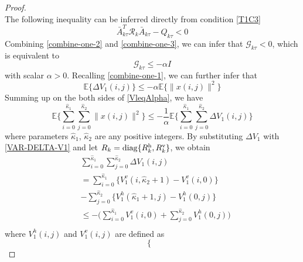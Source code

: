 \documentclass[journal,final,twocolumn]{IEEEtran}
\begin{document}
\begin{proof}
\begin{equation}
	\end{equation}
	The following inequality can be  inferred directly from condition \eqref{T1C3} 
	\begin{equation}\label{combine-one-3}
		\bar{A}^{T}_{k\tau }\mathcal{R}_{k}\bar{A}_{k\tau }-Q_{k\tau } < 0
	\end{equation}
	Combining \eqref{combine-one-2} and \eqref{combine-one-3}, we can infer that $\mathcal{G}_{k\tau }<0$, which is equivalent to 
	\begin{equation}
		\mathcal{G}_{k\tau } \leq -\alpha I
	\end{equation}
	with scalar $\alpha>0$.
	Recalling \eqref{combine-one-1}, we can further infer that
	\begin{equation}\label{VleqAlpha}
		\mathbb{E}\{\varDelta V_{1}(i,j) \} \leq-\alpha \mathbb{E}\{\|x(i,j)\|^{2} \}
	\end{equation}
	Summing up on the both sides of \eqref{VleqAlpha}, we have
	\begin{equation} \label{levE}
		\mathbb{E}\Big\{\sum_{i=0}^{\hat{\kappa}_{1}}\sum_{j=0}^{\hat{\kappa}_{2}}  \|x(i,j)\|^{2} \Big\} \leq -\frac{1}{\alpha} \mathbb{E}\Big\{\sum_{i=0}^{\hat{\kappa}_{1}}\sum_{j=0}^{\hat{\kappa}_{2}}  \varDelta V_{1}(i,j)  \Big\}
	\end{equation}
	where parameters $\hat{\kappa}_{1}$, $\hat{\kappa}_{2}$ are any positive integers. By substituting $\varDelta V_{1}$ with \eqref{VAR-DELTA-V1} and let $R_{k}=\mathrm{diag}\{R^{\rm{h}}_{k},R^{\rm{v}}_{k}\}$, we obtain
	\begin{equation} \label{Vhv}
		\begin{split}
			&\sum_{i=0}^{\hat{\kappa}_{1}}\sum_{j=0}^{\hat{\kappa}_{2}}  \varDelta V_{1}(i,j)\\&= \sum_{i=0}^{\hat{\kappa}_{1}}\big\{V^{v}_{1}(i,\hat{\kappa}_{2}+1) - V^{v}_{1}(i,0) \big\}\\
			&-  \sum_{j=0}^{\hat{\kappa}_{2}}\big\{V^{h}_{1}(\hat{\kappa}_{1}+1,j) - V^{h}_{1}(0,j) \big\}\\
			&\leq -\big( \sum_{i=0}^{\hat{\kappa}_{1}}V^{v}_{1}(i,0) + \sum_{j=0}^{\hat{\kappa}_{2}}V^{h}_{1}(0,j)\big) \\
		\end{split}
	\end{equation} 
	where $V_{1}^{h}(i,j)$ and $V_{1}^{v}(i,j)$ are defined as   
	\begin{equation*}
	\left\{
	\begin{array}{lr}

\end{array}
\end{equation*}
\end{proof}
\end{document}
